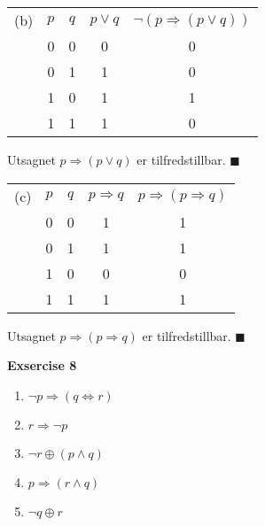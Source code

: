 \documentclass[a4paper, 12pt]{article}  %
\begin{document}
\begin{table}[H]
    \begin{tabular}{c|c|c|c|c|}
        (b) & $p$ & $q$ & $p \lor q$ & $\neg(p \Rightarrow (p \lor q))$ \\
            & 0   & 0   & 0          & 0                                \\
            & 0   & 1   & 1          & 0                                \\
            & 1   & 0   & 1          & 1                                \\
            & 1   & 1   & 1          & 0                                \\
    \end{tabular}
    \begin{center}
        Utsagnet $p \Rightarrow (p \lor q)$ er tilfredstillbar. $\blacksquare$
    \end{center}
\end{table}

\begin{table}[H]
    \begin{tabular}{c|c|c|c|c|}
        (c) & $p$ & $q$ & $p \Rightarrow q$ & $p \Rightarrow (p \Rightarrow q)$ \\
            & 0   & 0   & 1                 & 1                                 \\
            & 0   & 1   & 1                 & 1                                 \\
            & 1   & 0   & 0                 & 0                                 \\
            & 1   & 1   & 1                 & 1                                 \\
    \end{tabular}
    \begin{center}
        Utsagnet $p \Rightarrow (p \Rightarrow q)$ er tilfredstillbar. $\blacksquare$
    \end{center}
\end{table}

\textbf{Exsercise 8}

\begin{enumerate}
    \item \(\neg p \Rightarrow (q \Leftrightarrow r )\)
    \item \(r \Rightarrow \neg p\)
    \item \(\neg r \oplus (p \land q)\)
    \item \(p \Rightarrow (r \land q)\)
    \item \(\neg q \oplus r\)
\end{enumerate}
\end{document}
